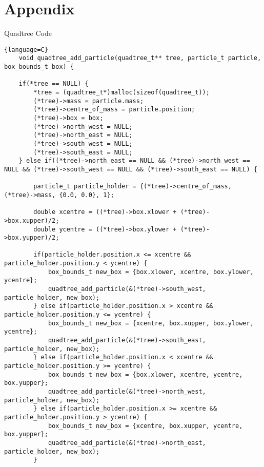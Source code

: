\documentclass{article}
\begin{document}
\section{Appendix}
\begin{center}
    Quadtree Code
\end{center}
\begin{lstlisting}{language=C}
    void quadtree_add_particle(quadtree_t** tree, particle_t particle, box_bounds_t box) {

    if(*tree == NULL) {
        *tree = (quadtree_t*)malloc(sizeof(quadtree_t));
        (*tree)->mass = particle.mass;
        (*tree)->centre_of_mass = particle.position;
        (*tree)->box = box;
        (*tree)->north_west = NULL;
        (*tree)->north_east = NULL;
        (*tree)->south_west = NULL;
        (*tree)->south_east = NULL;
    } else if((*tree)->north_east == NULL && (*tree)->north_west == NULL && (*tree)->south_west == NULL && (*tree)->south_east == NULL) {
        
        particle_t particle_holder = {(*tree)->centre_of_mass, (*tree)->mass, {0.0, 0.0}, 1};
        
        double xcentre = ((*tree)->box.xlower + (*tree)->box.xupper)/2;
        double ycentre = ((*tree)->box.ylower + (*tree)->box.yupper)/2;

        if(particle_holder.position.x <= xcentre && particle_holder.position.y < ycentre) {
            box_bounds_t new_box = {box.xlower, xcentre, box.ylower, ycentre};
            quadtree_add_particle(&(*tree)->south_west, particle_holder, new_box);
        } else if(particle_holder.position.x > xcentre && particle_holder.position.y <= ycentre) {
            box_bounds_t new_box = {xcentre, box.xupper, box.ylower, ycentre};
            quadtree_add_particle(&(*tree)->south_east, particle_holder, new_box);
        } else if(particle_holder.position.x < xcentre && particle_holder.position.y >= ycentre) {
            box_bounds_t new_box = {box.xlower, xcentre, ycentre, box.yupper};
            quadtree_add_particle(&(*tree)->north_west, particle_holder, new_box);
        } else if(particle_holder.position.x >= xcentre && particle_holder.position.y > ycentre) {
            box_bounds_t new_box = {xcentre, box.xupper, ycentre, box.yupper};
            quadtree_add_particle(&(*tree)->north_east, particle_holder, new_box);
        }


\end{lstlisting}
\end{document}
